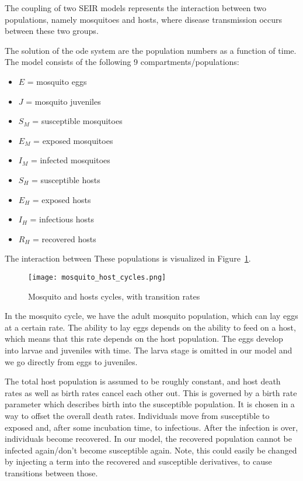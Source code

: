 \documentclass{article}
\begin{document}
The coupling of two SEIR models represents the interaction between two populations, namely mosquitoes and hosts, where disease transmission occurs between these two groups.


The solution of the ode system are the population numbers as a function of time.  
The model consists of the following 9 compartments/populations:

\begin{itemize}
    \item \( E \) = mosquito eggs
    \item \( J \) = mosquito juveniles
    \item \( S_M \) = susceptible mosquitoes
    \item \( E_M \) = exposed mosquitoes
    \item \( I_M \) = infected mosquitoes
    \item \( S_H \) = susceptible hosts
    \item \( E_H \) = exposed hosts
    \item \( I_H \) = infectious hosts
    \item \( R_H \) = recovered hosts
\end{itemize}

The interaction between These populations is visualized in Figure~\ref{mosquito_host_cycles}.
\begin{figure}
    \centering
    \texttt{[image: mosquito\_host\_cycles.png]}
    \caption{Mosquito and hosts cycles, with transition rates}
    \label{mosquito_host_cycles}
\end{figure}

In the mosquito cycle, we have the adult mosquito population, which can lay eggs at a certain rate. The ability to lay eggs depends on the ability to feed on a host, which means that this rate depends
on the host population. The eggs develop into larvae and juveniles with time. The larva stage is omitted in our model and we go directly from eggs to juveniles. 

The total host population is assumed to be roughly constant, and host death rates as well as birth rates cancel each other out. This is governed by a birth rate parameter which describes birth into the susceptible population. It is chosen in a way to offset the overall death rates. 
Individuals move from susceptible to exposed and, after some incubation time, to infectious. After the infection is over, individuals become recovered. In our model, the recovered population cannot be infected again/don't become susceptible again. Note, this could easily be changed by injecting a term into the recovered and susceptible derivatives, to cause transitions between those.
\end{document}
